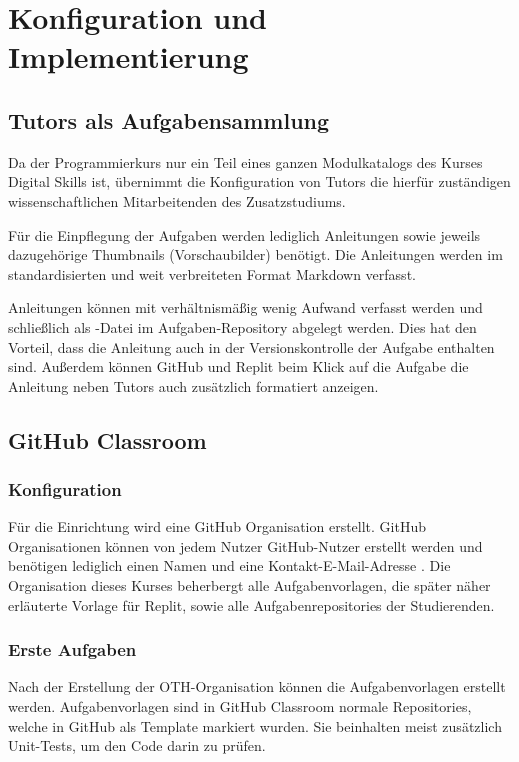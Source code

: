\section{Konfiguration und Implementierung}\label{konfiguration-u-impl}

\subsection{Tutors als Aufgabensammlung}\label{tutors-als-aufgabensammlung}
Da der Programmierkurs nur ein Teil eines ganzen Modulkatalogs des Kurses
Digital Skills ist, übernimmt die Konfiguration von Tutors die hierfür
zuständigen wissenschaftlichen Mitarbeitenden des Zusatzstudiums.

Für die Einpflegung der Aufgaben werden lediglich Anleitungen sowie
jeweils dazugehörige Thumbnails (Vorschaubilder) benötigt. Die Anleitungen
werden im standardisierten und weit verbreiteten Format Markdown verfasst.

Anleitungen können mit verhältnismäßig wenig Aufwand verfasst werden und
schließlich als -Datei im Aufgaben-Repository abgelegt
werden. Dies hat den Vorteil, dass die Anleitung auch in der Versionskontrolle
der Aufgabe enthalten sind. Außerdem können GitHub und Replit beim Klick auf die
Aufgabe die Anleitung neben Tutors auch zusätzlich formatiert anzeigen.

\subsection{GitHub Classroom}\label{github-classroom}
\subsubsection{Konfiguration}\label{classroom-konfiguration}
Für die Einrichtung wird eine GitHub Organisation erstellt. GitHub
Organisationen können von jedem Nutzer GitHub-Nutzer erstellt werden und
benötigen lediglich einen Namen und eine Kontakt-E-Mail-Adresse
\parencite{github-organisation-erstellen}. Die Organisation dieses Kurses
beherbergt alle Aufgabenvorlagen, die später näher erläuterte Vorlage für
Replit, sowie alle Aufgabenrepositories der Studierenden.

\subsubsection{Erste Aufgaben}\label{classroom-erste-aufgaben}
Nach der Erstellung der OTH-Organisation können die Aufgabenvorlagen erstellt
werden. Aufgabenvorlagen sind in GitHub Classroom normale Repositories, welche
in GitHub als Template markiert wurden. Sie beinhalten meist zusätzlich
Unit-Tests, um den Code darin zu prüfen.

